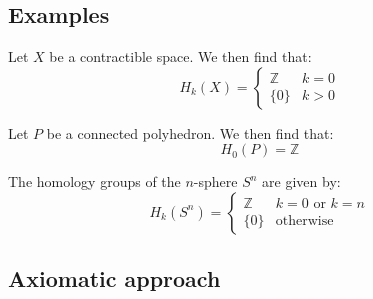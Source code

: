 \subsection{Examples}

	\begin{example}
		Let $X$ be a contractible space. We then find that:
		\begin{equation}
			H_k(X) = \begin{cases}
				\mathbb{Z}&k=0\\
				\{0\}&k>0
			\end{cases}
		\end{equation}
	\end{example}
	\begin{example}
		Let $P$ be a connected polyhedron. We then find that:
		\begin{equation}
			H_0(P) = \mathbb{Z}
		\end{equation}
	\end{example}
	\begin{example}
		The homology groups of the $n$-sphere $S^n$ are given by:
		\begin{equation}
			H_k(S^n)=\begin{cases}
				\mathbb{Z}&k=0\text{ or }k=n\\
				\{0\}&\text{otherwise}
			\end{cases}
		\end{equation}
	\end{example}

\subsection{Axiomatic approach}

